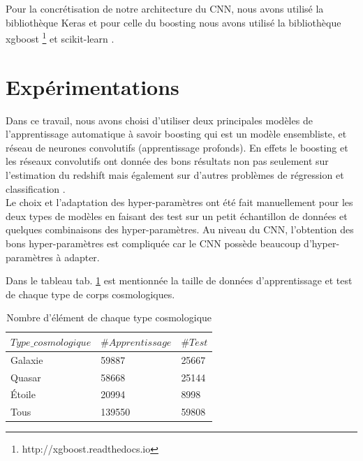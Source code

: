 Pour la concrétisation de notre architecture du CNN, nous avons utilisé la bibliothèque Keras \cite{chollet2015keras}  et pour celle du boosting nous avons utilisé la bibliothèque xgboost \footnote{http://xgboost.readthedocs.io} et scikit-learn \cite{scikit-learn}.
\section{Expérimentations}
Dans ce travail, nous avons choisi d'utiliser deux principales modèles de l'apprentissage automatique à savoir boosting qui est un modèle ensembliste, et réseau de neurones convolutifs (apprentissage profonds). En effets le boosting et les réseaux convolutifs ont donnée des bons résultats non pas seulement sur l'estimation du redshift \cite{meuphirim, isanto} mais également sur d'autres problèmes de régression et classification \cite{boost, adavencedCNN}. \\

Le choix et l'adaptation des hyper-paramètres ont été fait manuellement pour les deux types de modèles en faisant des test sur un petit échantillon de données et quelques combinaisons des hyper-paramètres. Au niveau du CNN, l'obtention des bons hyper-paramètres est compliquée car le CNN possède beaucoup d'hyper-paramètres à adapter.

Dans le tableau tab. \ref{quantite} est mentionnée la taille de données d'apprentissage et test de chaque type de corps cosmologiques.
\begin{table}[H]
	\centering
	\begin{tabular}{|l|l|l|}
		\hline
		$Type\_cosmologique$ & $\#Apprentissage$ & $\#Test$\\
		\hline
		Galaxie &  59887 & 25667\\
		\hline
		Quasar & 58668 & 25144\\
		\hline
		Étoile & 20994 & 8998 \\
		\hline
		Tous & 139550 & 59808 \\
		\hline
	\end{tabular}
	\caption{Nombre d'élément de chaque type cosmologique}
	\label{quantite}
\end{table}


